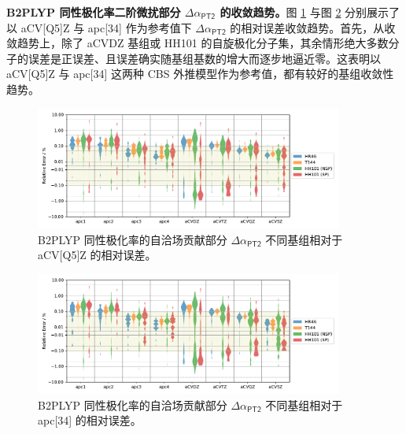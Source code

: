 \textbf{B2PLYP 同性极化率二阶微扰部分 $\Delta \alpha_\textsf{PT2}$ 的收敛趋势。}图 \ref{fig.6.converg-b2p-pt2-aCV5Z} 与图 \ref{fig.6.converg-b2p-pt2-apc4} 分别展示了以 aCV[Q5]Z 与 apc[34] 作为参考值下 $\Delta \alpha_\textsf{PT2}$ 的相对误差收敛趋势。首先，从收敛趋势上，除了 aCVDZ 基组或 HH101 的自旋极化分子集，其余情形绝大多数分子的误差是正误差、且误差确实随基组基数的增大而逐步地逼近零。这表明以 aCV[Q5]Z 与 apc[34] 这两种 CBS 外推模型作为参考值，都有较好的基组收敛性趋势。

\begin{figure}[ht]
    \centering
    \caption{B2PLYP 同性极化率的自洽场贡献部分 $\Delta \alpha_\textsf{PT2}$ 不同基组相对于 aCV[Q5]Z 的相对误差。}
    \label{fig.6.converg-b2p-pt2-aCV5Z}
    \includegraphics[width=0.9\textwidth]{assets/converg-b2p-pt2-aCV5Z.pdf}
\end{figure}

\begin{figure}[ht]
    \centering
    \caption{B2PLYP 同性极化率的自洽场贡献部分 $\Delta \alpha_\textsf{PT2}$ 不同基组相对于 apc[34] 的相对误差。}
    \label{fig.6.converg-b2p-pt2-apc4}
    \includegraphics[width=0.9\textwidth]{assets/converg-b2p-pt2-apc4.pdf}
\end{figure}


